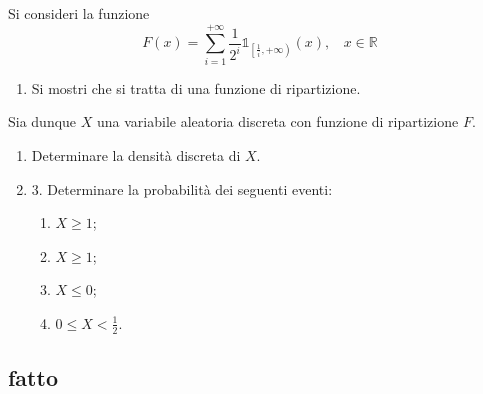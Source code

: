Si consideri la funzione
\begin{equation*}
F( x) =\sum\limits _{i=1}^{+\infty }\frac{1}{2^{i}}\mathbb{1}_{\left[\frac{1}{i} ,+\infty \right)}( x) ,\ \ \ \ x\in \mathbb{R}
\end{equation*}
\begin{enumerate}
\item Si mostri che si tratta di una funzione di ripartizione.
\end{enumerate}

Sia dunque $X$ una variabile aleatoria discreta con funzione di ripartizione $F$.
\begin{enumerate}
\item Determinare la densità discreta di $X$.
\item 3. Determinare la probabilità dei seguenti eventi:
\begin{enumerate}
\item $X\geq 1$;
\item $X\geq 1$;
\item $X\leq 0$;
\item $0\leq X< \frac{1}{2}$.
\end{enumerate}
\end{enumerate}
\subsection{fatto}


